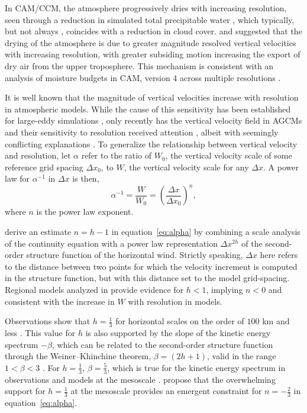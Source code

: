 \documentclass[times]{qjrms4}
\begin{document}
In CAM/CCM, the atmosphere progressively dries with increasing resolution, seen through a reduction in simulated total precipitable water \citep{KW1991JGR,WETAL1995CD,W2008TELLUS,RETAL2013JCLIM,ZetAl2014JCb,HR2017JCLIM}, which typically, but not always \citep[see][]{WETAL1995CD,ZetAl2014JCb}, coincides with a reduction in cloud cover. \cite{KW1991JGR} and \cite{WETAL1995CD} suggested that the drying of the atmosphere is due to greater magnitude resolved vertical velocities with increasing resolution, with greater subsiding motion increasing the export of dry air from the upper troposphere. This mechanism is consistent with an analysis of moisture budgets in CAM, version 4 \citep[CAM4;][]{CAM4} across multiple resolutions \citep{HR2017JCLIM}.

It is well known that the magnitude of vertical velocities increase with resolution in atmospheric models. While the cause of this sensitivity has been established for large-eddy simulations \citep[see][and references therein]{J2017JAMES}, only recently has the vertical velocity field in AGCMs and their sensitivity to resolution received attention \citep{DETALA2016ACP,OETAL2016JAMES}, albeit with seemingly conflicting explanations \citep{RETAL2016CD,HR2018JAMES}. To generalize the relationship between vertical velocity and resolution, let $\alpha$ refer to the ratio of $W_0$, the vertical velocity scale of some reference grid spacing $\Delta x_0$, to $W$, the vertical velocity scale for any $\Delta x$. A power law for $\alpha^{-1}$ in $\Delta x$ is then,
\begin{equation}
\alpha^{-1} = \frac{W}{W_0} = \left( \frac{\Delta x}{\Delta x_0} \right)^n, \label{eq:alpha}
\end{equation}
where $n$ is the power law exponent. 

\cite{RETAL2016CD} derive an estimate $n= h-1$ in equation~\ref{eq:alpha} by combining a scale analysis of the continuity equation with a power law representation $\Delta x^{2h}$ of the second-order structure function of the horizontal wind. Strictly speaking, $\Delta x$ here refers to the distance between two points for which the velocity increment is computed in the structure function, but with this distance set to the model grid-spacing. Regional models analyzed in \cite{RETAL2016CD} provide evidence for $h<1$, implying $n<0$ and consistent with the increase in $W$ with resolution in models.

Observations show that $h=\frac{1}{3}$ for horizontal scales on the order of $100$ km and less \citep[hereafter referred to as the {\em{mesoscale}};][]{L1999JFM,CL2001JGR}. This value for $h$ is also supported by the slope of the kinetic energy spectrum $-\beta$, which can be related to the second-order structure function through the Weiner–Khinchine theorem, $\beta = \left( 2h+1 \right)$, valid in the range $1<\beta<3$ \citep[satisfies stationarity;][]{DETAL1996JAS}. For $h=\frac{1}{3}$, $\beta=\frac{5}{3}$, which is true for the kinetic energy spectrum in observations \citep{NG1985JAS,CETAL1999JGR} and models at the mesoscale \citep[e.g.,][]{THO2006GRL,SPKS2014JAS}. \cite{RETAL2016CD} propose that the overwhelming support for $h=\frac{1}{3}$ at the mesoscale provides an emergent constraint for $n=-\frac{2}{3}$ in equation~\ref{eq:alpha}.
\end{document}
